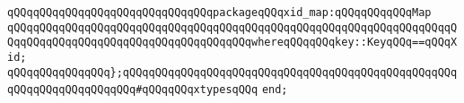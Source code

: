 \newline
\verb|qQQqqQQqqQQqqQQqqQQqqQQqqQQqqQQqpackageqQQqxid_map:qQQqqQQqqQQqMap|\newline
\verb|qQQqqQQqqQQqqQQqqQQqqQQqqQQqqQQqqQQqqQQqqQQqqQQqqQQqqQQqqQQqqQQqqQQqqQQqqQQqqQQqqQQqqQQqqQQqqQQqqQQqqQQqqQQqwhereqQQqqQQqkey::KeyqQQq==qQQqXid;|\newline
\newline
\verb|qQQqqQQqqQQqqQQq};qQQqqQQqqQQqqQQqqQQqqQQqqQQqqQQqqQQqqQQqqQQqqQQqqQQqqQQqqQQqqQQqqQQqqQQq#qQQqqQQqxtypesqQQq|\newline
\newline
\verb|end;|\newline
\newline
\newline
\newline

